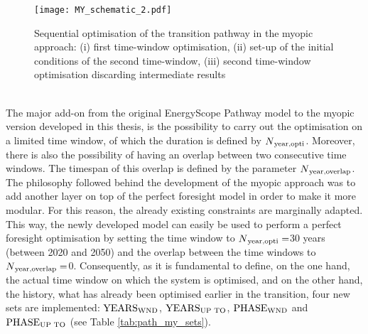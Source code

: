 \begin{figure}[htbp!]
\centering
\texttt{[image: MY\_schematic\_2.pdf]}
\caption{Sequential optimisation of the transition pathway in the myopic approach: (i) first time-window optimisation, (ii) set-up of the initial conditions of the second time-window, (iii) second time-window optimisation discarding intermediate results}
\label{fig:my_schematic_2}
\end{figure}

\\

\noindent
The major add-on from the original EnergyScope Pathway model \cite{limpens2021generating} to the myopic version developed in this thesis, is the possibility to carry out the optimisation on a limited time window, of which the duration is defined by $N\textsubscript{year,opti}$. Moreover, there is also the possibility of having an overlap between two consecutive time windows. The timespan of this overlap is defined by the parameter $N\textsubscript{year,overlap}$. The philosophy followed behind the development of the myopic approach was to add another layer on top of the perfect foresight model in order to make it more modular. For this reason, the already existing constraints are marginally adapted. This way, the newly developed model can easily be used to perform a perfect foresight optimisation by setting the time window to $N\textsubscript{year,opti}=$30 years (\ie between 2020 and 2050) and the overlap between the time windows to $N\textsubscript{year,overlap}=$0.  Consequently, as it is fundamental to define, on the one hand, the actual time window on which the system is optimised, and on the other hand, the history, \ie what has already been optimised earlier in the transition, four new sets are implemented: $\text{YEARS}\textsubscript{WND}$, $\text{YEARS}\textsubscript{UP TO}$, $\text{PHASE}\textsubscript{WND}$ and $\text{PHASE}\textsubscript{UP TO}$ (see Table \ref{tab:path_my_sets}).

